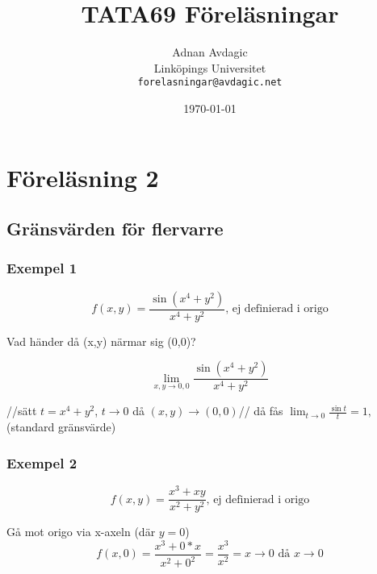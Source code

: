 \documentclass{article}
\title{TATA69 Föreläsningar}
\author{Adnan Avdagic\\
	Linköpings Universitet\\
	\texttt{forelasningar@avdagic.net}}
\date{\today}
\begin{document}
\hypersetup{pageanchor=false}
\begin{titlepage}
\maketitle
{}
\thispagestyle{empty}
\end{titlepage}

\hypersetup{pageanchor=true}
\thispagestyle{empty}
\tableofcontents
\thispagestyle{empty}

\newpage
\cleardoublepage
{}
\setcounter{page}{1}
\setcounter{section}{1}
\pagestyle{fancy}
\fancyhf{}
\rfoot{\rightmark}
\noindent
\section{Föreläsning 2}
\subsection{Gränsvärden för flervarre}

\subsubsection{Exempel 1} \flushleft
\begin{equation} \label{eq:2.1}
	f(x,y) = \frac{\sin(x^4+y^2)}{x^4+y^2} \text{, ej definierad i origo}
\end{equation}

Vad händer då (x,y) närmar sig (0,0)?

$$\lim_{x,y \rightarrow 0,0} \frac{\sin(x^4+y^2)}{x^4+y^2}$$

//sätt $t= \displaystyle x^4+y^2$, ${t \rightarrow 0}$ då ${(x,y) \rightarrow (0,0)}$// \newline
då fås \(\displaystyle \lim_{t \rightarrow 0} \frac{\sin t}{t} = 1,\) (standard gränsvärde) \newline

\subsubsection{Exempel 2} \flushleft
\begin{equation} \label{eq:2.2}
	f(x,y) = \frac{x^3+xy}{x^2+y^2} \text{, ej definierad i origo}
\end{equation}

Gå mot origo via x-axeln (där $y=0$)
\[f(x,0) = \frac{x^3+0*x}{x^2+0^2} = \frac{x^3}{x^2} =  {x \rightarrow 0} \text{ då } {x \rightarrow 0}\]
\end{document}
